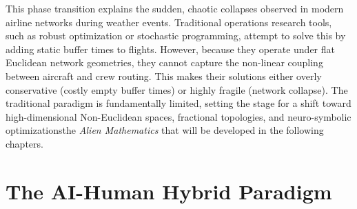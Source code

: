 \documentclass[11pt,a4paper]{book}
\begin{document}
This phase transition explains the sudden, chaotic collapses observed in modern airline networks during weather events. Traditional operations research tools, such as robust optimization or stochastic programming, attempt to solve this by adding static buffer times to flights. However, because they operate under flat Euclidean network geometries, they cannot capture the non-linear coupling between aircraft and crew routing. This makes their solutions either overly conservative (costly empty buffer times) or highly fragile (network collapse). The traditional paradigm is fundamentally limited, setting the stage for a shift toward high-dimensional Non-Euclidean spaces, fractional topologies, and neuro-symbolic optimizationsthe \textit{Alien Mathematics} that will be developed in the following chapters.



\chapter{The AI-Human Hybrid Paradigm}
\end{document}
